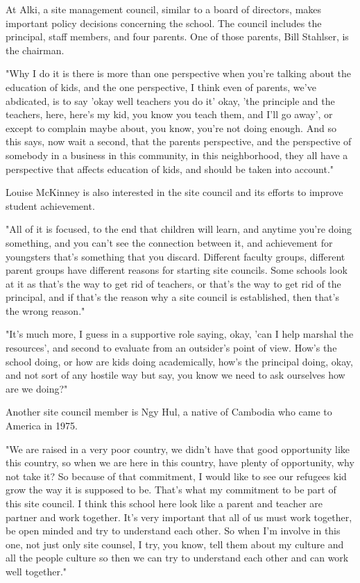 At Alki, a site management council, similar to a board of directors, makes important policy decisions concerning the school. The council includes the principal, staff members, and four parents. One of those parents, Bill Stahlser, is the chairman.

"Why I do it is there is more than one perspective when you're talking about the education of kids, and the one perspective, I think even of parents, we've abdicated, is to say 'okay well teachers you do it' okay, 'the principle and the teachers, here, here's my kid, you know you teach them, and I'll go away', or except to complain maybe about, you know, you're not doing enough. And so this says, now wait a second, that the parents perspective, and the perspective of somebody in a business in this community, in this neighborhood, they all have a perspective that affects education of kids, and should be taken into account."

Louise McKinney is also interested in the site council and its efforts to improve student achievement.

"All of it is focused, to the end that children will learn, and anytime you're doing something, and you can't see the connection between it, and achievement for youngsters that's something that you discard. Different faculty groups, different parent groups have different reasons for starting site councils. Some schools look at it as that's the way to get rid of teachers, or that's the way to get rid of the principal, and if that's the reason why a site council is established, then that's the wrong reason."

"It's much more, I guess in a supportive role saying, okay, 'can I help marshal the resources', and second to evaluate from an outsider's point of view. How's the school doing, or how are kids doing academically, how's the principal doing, okay, and not sort of any hostile way but say, you know we need to ask ourselves how are we doing?"

Another site council member is Ngy Hul, a native of Cambodia who came to America in 1975.

"We are raised in a very poor country, we didn't have that good opportunity like this country, so when we are here in this country, have plenty of opportunity, why not take it? So because of that commitment, I would like to see our refugees kid grow the way it is supposed to be. That's what my commitment to be part of this site council. I think this school here look like a parent and teacher are partner and work together. It's very important that all of us must work together, be open minded and try to understand each other. So when I'm involve in this one, not just only site counsel, I try, you know, tell them about my culture and all the people culture so then we can try to understand each other and can work well together."

